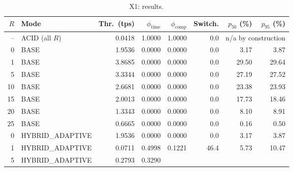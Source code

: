 \begin{table}[!htb]
  \centering
  \captionsetup{format=plain,justification=centering}
  \caption{X1: results.}
  \label{tab:x1-summary}
  \small
  \begin{tabular}{r l r r r r r r}
    \toprule
    $R$                    & Mode                   & Thr.\ (tps) &
    $\phi_{\mathrm{time}}$ & $\phi_{\mathrm{comp}}$ & Switch.     &
    $p_{50}$ (\%)          & $p_{95}$ (\%)
    \\
    \midrule
    --                     & ACID (all $R$)         & 0.0418      & 1.0000 &
    1.0000                 & 0.0                    &
    \multicolumn{2}{c}{n/a by construction}                                  \\
    \midrule
    0                      & BASE                   & 1.9536      & 0.0000 &
    0.0000                 & 0.0                    & 3.17        & 3.87
    \\
    1                      & BASE                   & 3.8685      & 0.0000 &
    0.0000                 & 0.0                    & 29.50       & 29.64
    \\
    5                      & BASE                   & 3.3344      & 0.0000 &
    0.0000                 & 0.0                    & 27.19       & 27.52
    \\
    10                     & BASE                   & 2.6681      & 0.0000 &
    0.0000                 & 0.0                    & 23.38       & 23.93
    \\
    15                     & BASE                   & 2.0013      & 0.0000 &
    0.0000                 & 0.0                    & 17.73       & 18.46
    \\
    20                     & BASE                   & 1.3343      & 0.0000 &
    0.0000                 & 0.0                    & 8.10        & 8.91
    \\
    25                     & BASE                   & 0.6665      & 0.0000 &
    0.0000                 & 0.0                    & 0.16        & 0.50
    \\
    \midrule
    0                      & HYBRID\_ADAPTIVE       & 1.9536      & 0.0000 &
    0.0000                 & 0.0                    & 3.17        & 3.87
    \\
    1                      & HYBRID\_ADAPTIVE       & 0.0711      & 0.4998 &
    0.1221                 & 46.4                   & 5.73        & 10.47
    \\
    5                      & HYBRID\_ADAPTIVE       & 0.2793      & 0.3290 &

\end{tabular}
\end{table}
